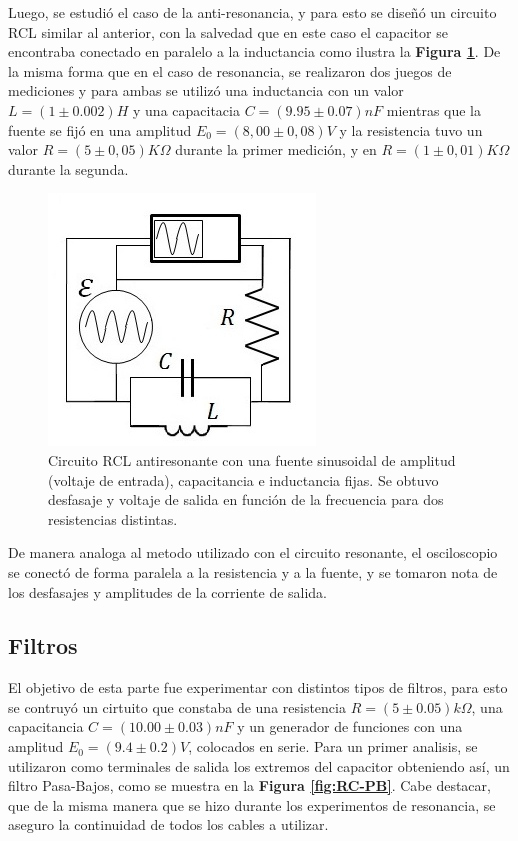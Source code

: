 \documentclass[11pt,a4paper]{article}
\begin{document}
Luego, se estudió el caso de la anti-resonancia, y para esto se diseñó un circuito RCL similar al anterior, con la salvedad que en este caso el capacitor se encontraba conectado en paralelo a la inductancia como ilustra la \textbf{Figura \ref{fig:RCL-ARes}}. De la misma forma que en el caso de resonancia, se realizaron dos juegos de mediciones y para ambas se utilizó una inductancia con un valor $L = (1 \pm0.002)H$ y una capacitacia $C = (9.95 \pm 0.07)nF$ mientras que la fuente se fijó en una amplitud $E_{0} = (8,00 \pm 0,08)V$ y la resistencia tuvo un valor $R = (5 \pm 0,05)K\Omega$ durante la primer medición, y en $R = (1 \pm 0,01)K\Omega$ durante la segunda.

\begin{figure}[h]
\centering
\includegraphics[scale=0.7]{Circuito-RCL-AntiResonante}
  \caption{Circuito RCL antiresonante con una fuente sinusoidal de amplitud (voltaje de entrada), capacitancia e inductancia fijas. Se obtuvo desfasaje y voltaje de salida en función de la frecuencia para dos resistencias distintas.}
  \label{fig:RCL-ARes}
\end{figure}

De manera analoga al metodo utilizado con el circuito resonante, el osciloscopio se conectó de forma paralela a la resistencia y a la fuente, y se tomaron nota de los desfasajes y amplitudes de la corriente de salida.


\subsection{Filtros}

El objetivo de esta parte fue experimentar con distintos tipos de filtros, para esto se contruyó un cirtuito que constaba de una resistencia $R = (5 \pm 0.05)k\Omega$, una capacitancia $C = (10.00 \pm 0.03)nF$ y un generador de funciones con una amplitud $E_{0} = (9.4 \pm 0.2)V$, colocados en serie. Para un primer analisis, se utilizaron como terminales de salida los extremos del capacitor obteniendo así, un filtro Pasa-Bajos, como se muestra en la \textbf{Figura \ref{fig:RC-PB}}. Cabe destacar, que de la misma manera que se hizo durante los experimentos de resonancia, se aseguro la continuidad de todos los cables a utilizar.
\end{document}
